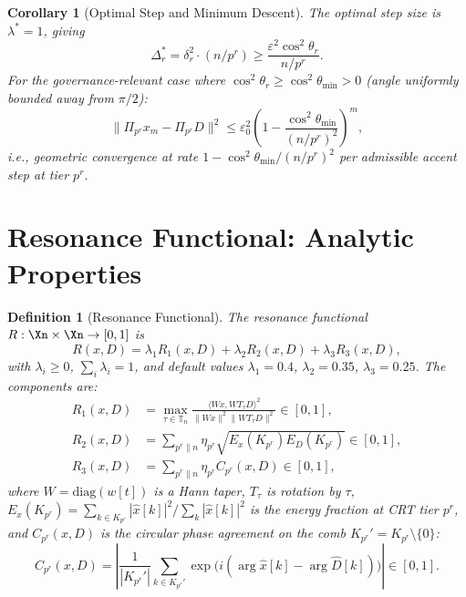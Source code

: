 \documentclass[11pt]{amsart}
\newtheorem{corollary}[theorem]{Corollary}
\newtheorem{definition}[theorem]{Definition}
\newcommand{\Prj}{\Pi}
\newcommand{\Tn}{\mathbb{T}_n}
\newcommand{\norm}[1]{\lVert #1 \rVert}
\begin{document}
\begin{corollary}[Optimal Step and Minimum Descent]\label{cor:optimal-step}
The optimal step size is $\lambda^* = 1$, giving
\[
  \Delta_r^* = \delta_r^2 \cdot (n/p^r) \geq \frac{\varepsilon^2 \cos^2\theta_r}{n/p^r}.
\]
For the governance-relevant case where $\cos^2\theta_r \geq \cos^2\theta_{\min} > 0$ (angle uniformly bounded away from $\pi/2$):
\[
  \norm{\Prj_{p^r} x_m - \Prj_{p^r} D}^2 \leq \varepsilon_0^2 \left(1 - \frac{\cos^2\theta_{\min}}{(n/p^r)^2}\right)^m,
\]
i.e., geometric convergence at rate $1 - \cos^2\theta_{\min}/(n/p^r)^2$ per admissible accent step at tier $p^r$.
\end{corollary}

\section{Resonance Functional: Analytic Properties}
\label{sec:resonance}

\begin{definition}[Resonance Functional]\label{def:resonance}
The resonance functional $R : \Xn \times \Xn \to [0,1]$ is
\[
  R(x, D) = \lambda_1 R_1(x,D) + \lambda_2 R_2(x,D) + \lambda_3 R_3(x,D),
\]
with $\lambda_i \geq 0$, $\sum_i \lambda_i = 1$, and default values $\lambda_1 = 0.4$, $\lambda_2 = 0.35$, $\lambda_3 = 0.25$. The components are:
\begin{align*}
  R_1(x,D) &= \max_{\tau \in \Tn} \frac{\langle Wx, WT_\tau D\rangle^2}{\norm{Wx}^2\norm{WT_\tau D}^2} \in [0,1], \\
  R_2(x,D) &= \sum_{p^r \| n} \eta_{p^r} \sqrt{E_x(K_{p^r}) E_D(K_{p^r})} \in [0,1], \\
  R_3(x,D) &= \sum_{p^r \| n} \eta_{p^r} C_{p^r}(x,D) \in [0,1],
\end{align*}
where $W = \mathrm{diag}(w[t])$ is a Hann taper, $T_\tau$ is rotation by $\tau$, $E_x(K_{p^r}) = \sum_{k \in K_{p^r}}|\hat{x}[k]|^2 / \sum_k |\hat{x}[k]|^2$ is the energy fraction at CRT tier $p^r$, and $C_{p^r}(x,D)$ is the circular phase agreement on the comb $K_{p^r}' = K_{p^r} \setminus \{0\}$:
\[
  C_{p^r}(x,D) = \left|\frac{1}{|K_{p^r}'|}\sum_{k \in K_{p^r}'} \exp\bigl(i(\arg\hat{x}[k] - \arg\hat{D}[k])\bigr)\right| \in [0,1].
\]
\end{definition}
\end{document}

